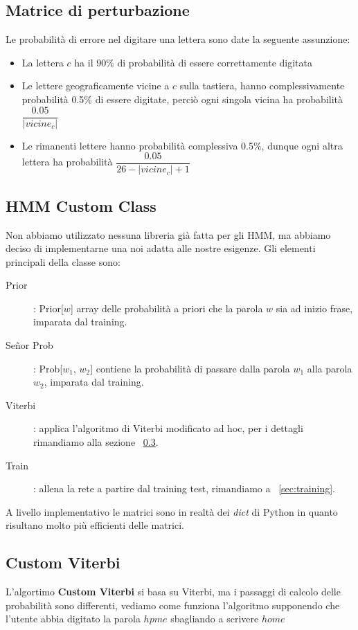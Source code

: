 \subsection{Matrice di perturbazione}
\label{sec:pertu}
Le probabilit\`a di errore nel digitare una lettera sono date la
seguente assunzione:
\begin{itemize}
  \item La lettera $c$ ha il 90\% di probabilit\`a di essere 
  correttamente digitata
  \item Le lettere geograficamente vicine a $c$ sulla tastiera, hanno
  complessivamente probabilit\`a 0.5\% di essere digitate, perci\`o 
  ogni singola vicina ha probabilit\`a $\dfrac{0.05}{|vicine_c|}$
  \item Le rimanenti lettere hanno probabilit\`a complessiva 0.5\%, 
  dunque ogni altra lettera ha probabilit\`a $\dfrac{0.05}{26 - |vicine_c| + 1}$
\end{itemize}

\subsection{HMM Custom Class}
Non abbiamo utilizzato nessuna libreria gi\`a fatta per gli HMM, ma 
abbiamo deciso di implementarne una noi adatta alle nostre esigenze.
Gli elementi principali della classe sono:
\begin{description}
  \item[Prior]: Prior[$w$] array delle probabilit\`a a priori che la 
  parola $w$ sia ad inizio frase, imparata dal training.
  \item[Señor Prob]: Prob[$w_1$, $w_2$] contiene la probabilit\`a 
  di passare dalla parola $w_1$ alla parola $w_2$, imparata dal training.
  \item[Viterbi]: applica l'algoritmo di Viterbi modificato ad hoc,
  per i dettagli rimandiamo alla sezione ~\ref{sec:vitello}.
  \item[Train]: allena la rete a partire dal training test,
  rimandiamo a ~\ref{sec:training}.
\end{description}
A livello implementativo le matrici sono in realt\`a dei \textit{dict} di 
Python in quanto risultano molto pi\`u efficienti delle matrici.


\subsection{Custom Viterbi}
\label{sec:vitello}
L'algortimo \textbf{Custom Viterbi} si basa su Viterbi, ma i passaggi 
di calcolo delle probabilit\`a sono differenti, vediamo come funziona
l'algoritmo supponendo che l'utente abbia digitato la parola $hpme$ 
sbagliando a scrivere $home$


